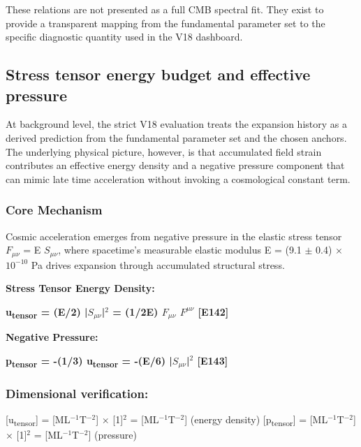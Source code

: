 \documentclass[11pt,a4paper]{article}
\begin{document}
These relations are not presented as a full CMB spectral fit. They exist to provide a transparent mapping from the fundamental parameter set to the specific diagnostic quantity used in the V18 dashboard.

\subsection{Stress tensor energy budget and effective pressure}
At background level, the strict V18 evaluation treats the expansion history as a derived prediction from the fundamental parameter set and the chosen anchors. The underlying physical picture, however, is that accumulated field strain contributes an effective energy density and a negative pressure component that can mimic late time acceleration without invoking a cosmological constant term.

\subsubsection{Core Mechanism}
Cosmic acceleration emerges from negative pressure in the elastic stress tensor $F_{\mu\nu}$ = E $S_{\mu\nu}$, where spacetime's measurable elastic modulus E = (9.1 $\pm$ 0.4) $\times$ $10^{-10}$ Pa drives expansion through accumulated structural stress.

\textbf{Stress Tensor Energy Density:}

\textbf{u\textsubscript{tensor} = (E/\allowbreak{}2) |$S_{\mu\nu}$|$^{2}$ = (1/\allowbreak{}2E) $F_{\mu\nu}$ $F^{\mu\nu}$ [E142]}

\textbf{Negative Pressure:}

\textbf{p\textsubscript{tensor} = -(1/\allowbreak{}3) u\textsubscript{tensor} = -(E/\allowbreak{}6) |$S_{\mu\nu}$|$^{2}$ [E143]}

\begin{mdframed}[linecolor=accent,linewidth=0.5pt,backgroundcolor=callout-bg,leftline=true,rightline=true,topline=true,bottomline=true,innerleftmargin=8pt,innerrightmargin=8pt,innertopmargin=6pt,innerbottommargin=6pt]
\subsubsection{Dimensional verification:}
[u\textsubscript{tensor}] = [ML$^{-1}$T$^{-2}$] $\times$ [1]$^{2}$ = [ML$^{-1}$T$^{-2}$] \checkmark{} (energy density)\newline{}
[p\textsubscript{tensor}] = [ML$^{-1}$T$^{-2}$] $\times$ [1]$^{2}$ = [ML$^{-1}$T$^{-2}$] \checkmark{} (pressure)
\end{mdframed}
\end{document}
